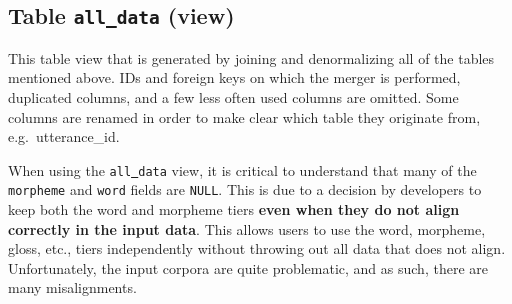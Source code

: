 \documentclass[a4paper, 11pt]{book}
\newcommand{\und}{\underline{{ }}\hspace{0.2mm}}	%
\begin{document}
\subsection{Table \texttt{all\und data} (view)}
\label{subsec:Table all_data}

This table view that is generated by joining and denormalizing all of the tables mentioned above. IDs and foreign keys on which the merger is performed, duplicated columns, and a few less often used columns are omitted. Some columns are renamed in order to make clear which table they originate from, e.g.\ utterance\_id. 

When using the \texttt{all\und data} view, it is critical to understand that many of the \texttt{morpheme} and \texttt{word} fields are \texttt{NULL}. This is due to a decision by developers to keep both the word and morpheme tiers \textbf{even when they do not align correctly in the input data}. This allows users to use the word, morpheme, gloss, etc., tiers independently without throwing out all data that does not align. Unfortunately, the input corpora are quite problematic, and as such, there are many misalignments.
\end{document}
